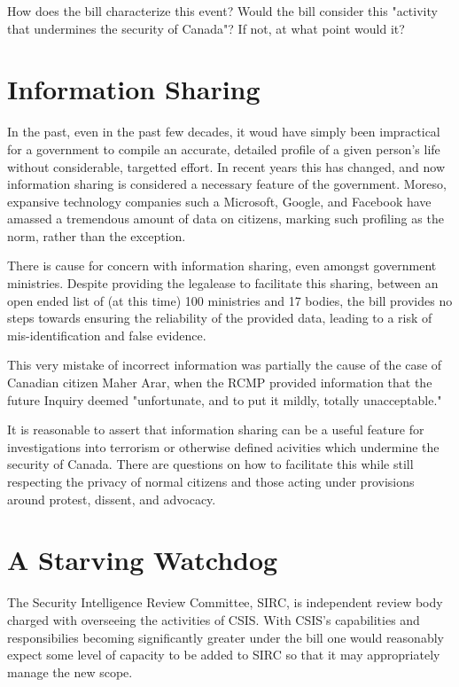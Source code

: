 \documentclass[a4paper, 11pt]{article} %
\begin{document}
How does the bill characterize this event? Would the bill consider this "activity that undermines the security of Canada"? If not, at what point would it?

\section*{Information Sharing}
In the past, even in the past few decades, it woud have simply been impractical for a government to compile an accurate, detailed profile of a given person's life without considerable, targetted effort. In recent years this has changed, and now information sharing is considered a necessary feature of the government. \cite{total-awareness} Moreso, expansive technology companies such a Microsoft, Google, and Facebook have amassed a tremendous amount of data on citizens, marking such profiling as the norm, rather than the exception.

There is cause for concern with information sharing, even amongst government ministries. Despite providing the legalease to facilitate this sharing, between an open ended list of (at this time) 100 ministries and 17 bodies, the bill provides no steps towards ensuring the reliability of the provided data, leading to a risk of mis-identification and false evidence.

This very mistake of incorrect information was partially the cause of the case of Canadian citizen Maher Arar, when the RCMP provided information that the future Inquiry deemed "unfortunate, and to put it mildly, totally unacceptable." \cite{arar}

It is reasonable to assert that information sharing can be a useful feature for investigations into terrorism or otherwise defined acivities which undermine the security of Canada. There are questions on how to facilitate this while still respecting the privacy of normal citizens and those acting under provisions around protest, dissent, and advocacy.

\section*{A Starving Watchdog}
The Security Intelligence Review Committee, SIRC, is independent review body charged with overseeing the activities of CSIS. With CSIS's capabilities and responsibilies becoming significantly greater under the bill one would reasonably expect some level of capacity to be added to SIRC so that it may appropriately manage the new scope.
\end{document}
